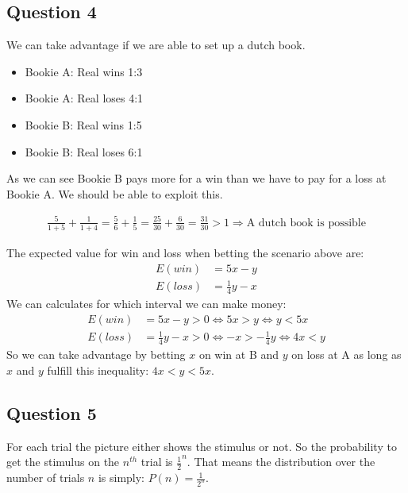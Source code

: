 \documentclass[../main/Notes.tex]{subfiles}
\begin{document}
\subsection*{Question 4}
We can take advantage if we are able to set up a dutch book.
\begin{itemize}
	\item Bookie A: Real wins 1:3
  \item Bookie A: Real loses 4:1
	\item Bookie B: Real wins 1:5
  \item Bookie B: Real loses 6:1
\end{itemize}

As we can see Bookie B pays more for a win than we have to pay for a loss at Bookie A. We should be able to exploit this.

\begin{align*}
\frac{5}{1+5}+\frac{1}{1+4} = \frac{5}{6} + \frac{1}{5} = \frac{25}{30} + \frac{6}{30} = \frac{31}{30} > 1 \Rightarrow \text{A dutch book is possible}
\end{align*}

The expected value for win and loss when betting the scenario above are:
\begin{align*}
E(win)  &= 5x-y \\
E(loss) &= \frac{1}{4}y-x
\end{align*}
We can calculates for which interval we can make money:
\begin{align*}
E(win)  &= 5x-y           > 0 \Leftrightarrow 5x>y             \Leftrightarrow y < 5x \\
E(loss) &= \frac{1}{4}y-x > 0 \Leftrightarrow -x>-\frac{1}{4}y \Leftrightarrow 4x < y
\end{align*}
So we can take advantage by betting $x$ on win at B and $y$ on loss at A as long as $x$ and $y$ fulfill this inequality: $4x<y<5x$.



\subsection*{Question 5}
For each trial the picture either shows the stimulus or not. So the probability to get the stimulus on the $n^{th}$ trial is $\frac{1}{2}^n$.
That means the distribution over the number of trials $n$ is simply: $P(n) = \frac{1}{2^n}$.
\end{document}
